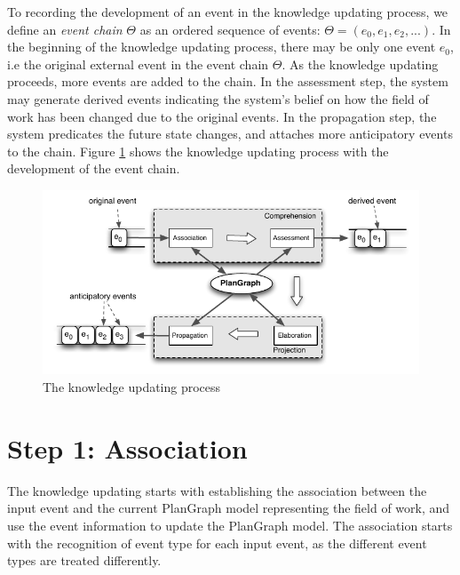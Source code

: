 To recording the development of an event in the knowledge updating process, we define an \emph{event chain} $\Theta$ as an ordered sequence of events: $\Theta=(e_0, e_1, e_2, ...)$. In the beginning of the knowledge updating process, there may be only one event $e_0$, i.e the original external event in the event chain $\Theta$. As the knowledge updating proceeds, more events are added to the chain. In the assessment step, the system may generate derived events indicating the system's belief on how the field of work has been changed due to the original events. In the propagation step, the system predicates the future state changes, and attaches more anticipatory events to the chain. Figure \ref{fig:knowledge_updating} shows the knowledge updating process with the development of the event chain.
\begin{figure}[htbp] %
	\centering
	\includegraphics{knowledge_updating.pdf} 
	\caption{The knowledge updating process}
	\label{fig:knowledge_updating}
\end{figure}

\section{Step 1: Association} %
\label{sec:step_1_association}
The knowledge updating starts with establishing the association between the input event and the current PlanGraph model representing the field of work, and use the event information to update the PlanGraph model. The association starts with the recognition of event type for each input event, as the different event types are treated differently.

